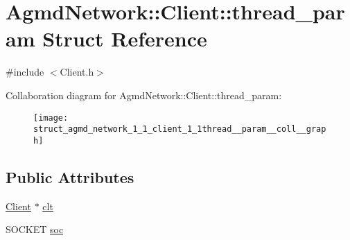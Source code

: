 \hypertarget{struct_agmd_network_1_1_client_1_1thread__param}{\section{Agmd\+Network\+:\+:Client\+:\+:thread\+\_\+param Struct Reference}
\label{struct_agmd_network_1_1_client_1_1thread__param}
}


{\ttfamily \#include $<$Client.\+h$>$}



Collaboration diagram for Agmd\+Network\+:\+:Client\+:\+:thread\+\_\+param\+:\nopagebreak
\begin{figure}[H]
\begin{center}
\leavevmode
\texttt{[image: struct\_agmd\_network\_1\_1\_client\_1\_1thread\_\_param\_\_coll\_\_graph]}
\end{center}
\end{figure}
\subsection*{Public Attributes}
\begin{DoxyCompactItemize}
\item 
\hyperlink{class_agmd_network_1_1_client}{Client} $\ast$ \hyperlink{struct_agmd_network_1_1_client_1_1thread__param_afdf3dc4843047849eb283a242441c6e0}{clt}
\item 
S\+O\+C\+K\+E\+T \hyperlink{struct_agmd_network_1_1_client_1_1thread__param_a53e4d946c18418fc9a740c052f412ecb}{soc}
\end{DoxyCompactItemize}


